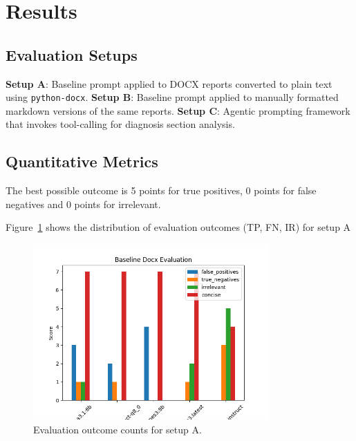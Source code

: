 \section{Results}

\subsection{Evaluation Setups}

\textbf{Setup A}: Baseline prompt applied to DOCX reports converted to plain text using \texttt{python-docx}.  
\textbf{Setup B}: Baseline prompt applied to manually formatted markdown versions of the same reports.  
\textbf{Setup C}: Agentic prompting framework that invokes tool-calling for diagnosis section analysis.

\subsection{Quantitative Metrics}
The best possible outcome is 5 points for true positives, 0 points for false
negatives and 0 points for irrelevant.

Figure~\ref{fig:baseline_docx} shows the distribution of evaluation outcomes
(TP, FN, IR) for setup A

\begin{figure}[H]
  \centering
  \includegraphics[width=0.8\textwidth]{baseline_docx.png}
  \caption{Evaluation outcome counts for setup A.}
  \label{fig:baseline_docx}
\end{figure}

